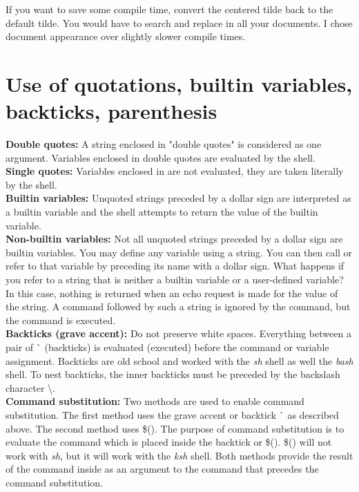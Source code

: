 If you want to save some compile time, convert the centered tilde back to the default tilde. You would have to search and replace in all your documents. I chose document appearance over slightly slower compile times.

\section{Use of quotations, builtin variables, backticks, parenthesis}

\textbf{{\color{red}Double quotes:}} A string enclosed in "double quotes" is considered as one argument. Variables enclosed in double quotes are evaluated by the shell.\\

\textbf{{\color{red}Single quotes:}}  Variables enclosed in  are not evaluated, they are taken literally by the shell.\\

\textbf{{\color{red}Builtin variables:}}  Unquoted strings preceded by a dollar sign are interpreted as a builtin variable and the shell attempts to return the value of the builtin variable.\\

\textbf{{\color{red}Non-builtin variables:}}  Not all unquoted strings preceded by a dollar sign are builtin variables. You may define any variable using a string. You can then call or refer to that variable by preceding its name with a dollar sign. What happens if you refer to a string that is neither a builtin variable or a user-defined variable? In this case, nothing is returned when an echo request is made for the value of the string. A command followed by such a string is ignored by the command, but the command is executed.\\

\textbf{{\color{red}Backticks (grave accent):}} Do not preserve white spaces. Everything between  a pair of \`{} (backticks) is evaluated (executed) before the command or variable assignment. Backticks are old school and worked with the \emph{sh} shell as well the \emph{bash} shell. To nest backticks, the inner backticks must be preceded by the backslash character \textbackslash.\\

\textbf{{\color{red}Command substitution:}} Two methods are used to enable command substitution. The first method uses the grave accent or backtick \`{} as described above. The second method uses \$(). The purpose of command substitution is to evaluate the command which is placed inside the backtick or \$().  \$() will not work with \emph{sh}, but it will work with the \emph{ksh} shell. Both methods provide the  result of the command inside as an argument to the command that precedes the command substitution.\\

